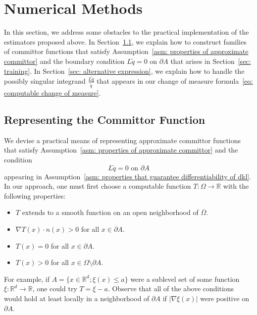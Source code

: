 \documentclass[reqno]{amsart}
\newcommand{\Real}{\mathbb{R}}
\newcommand{\1}{\mathds{1}}
\newcommand{\grad}{\nabla}
\theoremstyle{definition}
\theoremstyle{remark}
\begin{document}
\section{Numerical Methods}
\label{sec: numerical}

In this section, we address some obstacles to the practical implementation of the estimators proposed above. In Section~\ref{sec: representing the committor}, we explain how to construct families of committor functions that satisfy Assumption~\ref{asm: properties of approximate committor} and the boundary condition $L\tilde q=0$ on $\partial A$ that arises in Section~\ref{sec: training}. In Section~\ref{sec: alternative expression}, we explain how to handle the possibly singular integrand $\frac{L \tilde q}{\tilde q}$ that appears in our change of measure formula~\eqref{eq: computable change of measure}.

\subsection{Representing the Committor Function}
\label{sec: representing the committor}
We devise a practical means of representing approximate committor functions that satisfy Assumption~\ref{asm: properties of approximate committor} and the condition
\begin{equation*}
  L \tilde q = 0 \text{ on } \partial A
\end{equation*}
appearing in Assumption~\ref{asm: properties that guarantee differentiability of dkl}.
In our approach, one must first choose a computable function $T: \Omega \rightarrow \Real$ with the following properties:
\begin{itemize}
\item $T$ extends to a smooth function on an open neighborhood of $\overline \Omega$.
\item  $\grad T(x) \cdot n(x) > 0$ for all $x \in \partial A$.
\item $T(x) =0$ for all $x \in \partial A$.
\item $T(x) >0$ for all $x \in \Omega \setminus \partial A$. 
\end{itemize}
For example, if $A = \{x \in \Real^d; \xi(x) \leq a\}$ were a sublevel set of some function $\xi: \Real^d \rightarrow \Real$, one could try $T=\xi-a$. Observe that all of the above conditions would hold at least locally in a neighborhood of $\partial A$ if $\lvert \grad \xi(x) \rvert$ were positive on $\partial A$. 
\end{document}
